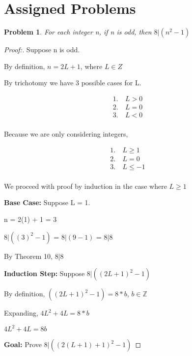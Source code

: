 \documentclass[12pt]{article}
\newtheorem{theorem}{Problem}[section]
\begin{document}
\section{Assigned Problems}

\begin{theorem}
    For each integer n, if n is odd, then $8 | (n^2 - 1)$
\end{theorem}

\begin{proof}[Proof:]

    Suppose n is odd.

    By definition, $n = 2L + 1$, where $L \in Z$

    By trichotomy we have 3 possible cases for L.

    \[
        \begin{aligned}
        1. &\ L > 0 \\
        2. &\ L = 0 \\
        3. &\ L < 0 \\
        \end{aligned}
    \]

    Because we are only considering integers,

    \[
        \begin{aligned}
        1. &\ L \geq 1 \\
        2. &\ L = 0 \\
        3. &\ L \leq -1 \\
        \end{aligned}
    \]

    We proceed with proof by induction in the case where $L \geq 1$

    \medskip

    \textbf{Base Case:} Suppose L = 1. 
    
    n = 2(1) + 1 = 3
    
    $8 | ((3)^2 - 1)$ = $8 | (9 - 1)$ = $8 | 8$

    By Theorem 10, $8 | 8$  
    
    \medskip

    \textbf{Induction Step:} Suppose $8 | ((2L+1)^2 - 1)$

    By definition, $((2L + 1)^2 - 1) = 8 * b$, $b \in \mathbb{Z}$

    Expanding, $4L^2 + 4L = 8 * b$

    $4L^2 + 4L = 8b$

    \medskip

    \textbf{Goal:} Prove $8 | ((2(L + 1) + 1)^2 - 1)$


\end{proof}
\end{document}

